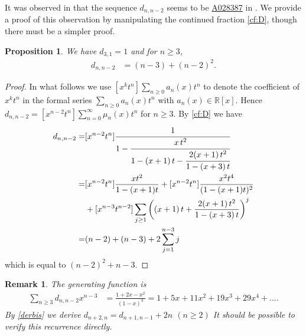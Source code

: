 \documentclass[12pt,reqno]{amsart}
\numberwithin{equation}{section}
\def\R{\mathbb{ R}}
\newtheorem{prop}{Proposition}
\newtheorem{rem}{Remark}
\begin{document}
It was observed in \cite{AG21} that 
the sequence $d_{n, n-2}$ seems to be   \href{http://oeis.org/A028387}{A028387} in \cite{Sl19}. We provide a proof of this observation by manipulating the continued fraction \eqref{cf:D}, though there must be a simpler proof. 
\begin{prop}  We have $d_{3,1}=1$ and for $n\geq 3$,
	\begin{align}
		d_{n, n-2}&=(n-3)+(n-2)^2.\label{derbis}
	\end{align}
\end{prop}
\begin{proof}  In what follows
 we use  $[x^kt^n]\sum_{n\geq 0}a_n(x)t^n$ to denote the coefficient of 
 $x^kt^n$ in the formal series $\sum_{n\geq 0}a_n(x)t^n$ with $a_n(x)\in \R[x]$. 
 Hence $d_{n,n-2}=[x^{n-2}t^n]\sum_{n=0}^\infty \mu_n(x)t^n$ for $n\geq 3$.
 By \eqref{cf:D} we have 
	\begin{align*}
		d_{n,n-2}
		=&[x^{n-2}t^n]\cfrac{1}
		{1-\cfrac{x\, t^2}{1-(x+1)\, t-\cfrac{2(x+1)\, t^2}{1-
					(x+3)\, t}}}\\
		=&[x^{n-2}t^n]\frac{xt^2}{1-(x+1)t}+
		[x^{n-2}t^n]\frac{x^2t^4}{(1-(x+1)t)^2}\\
		&+
		[x^{n-3}t^{n-2}]\sum_{j\geq 1}\left(
		(x+1)\, t+\frac{2(x+1)\, t^2}{1-(x+3)\, t}\right)^j\\
		=&(n-2)+(n-3)+2\sum_{j=1}^{n-3}j
	\end{align*}
	which is equal to $(n-2)^2+n-3$. 
\end{proof}


\begin{rem}
	 The generating function is
	\begin{align}
	\sum_{n\geq 3} d_{n, n-2}x^{n-3}&=\frac{1+2x-x^2}{(1-x)^3}=1+5x+11x^2+19x^3+29 x^4+\ldots.\label{derbis:gf}
\end{align}	
	By \eqref{derbis} 
	we derive $
		d_{n+2, n}=d_{n+1, n-1}+2n$ $(n\geq 2)$
	It  should be possible
	to verify this recurrence directly. 
\end{rem}
\end{document}
